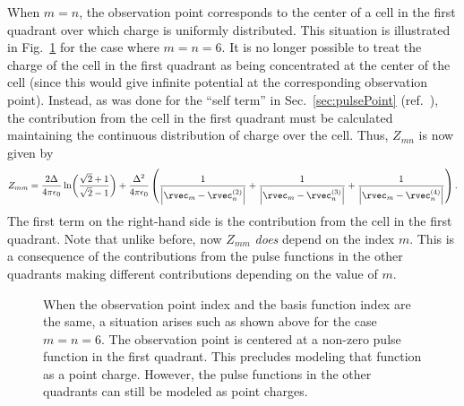 When $m=n$, the observation point corresponds to the center of a cell
in the first quadrant over which charge is uniformly distributed.
This situation is illustrated in Fig.\ \ref{fig:pFourSixSelf} for the
case where $m=n=6$.  It is no longer possible to treat the charge of
the cell in the first quadrant as being concentrated at the center of
the cell (since this would give infinite potential at the
corresponding observation point).  Instead, as was done for the ``self
term'' in Sec.\ \ref{sec:pulsePoint} (ref.\ ), the
contribution from the cell in the first quadrant must be calculated
maintaining the continuous distribution of charge over the cell.
Thus, $Z_{mn}$ is now given by
\begin{equation}
  Z_{mm} = 
   \frac{2\Delta}{4\pi\epsilon_0}
   \ln\!\left(\frac{\sqrt{2}+1}{\sqrt{2}-1}\right) + 
  \frac{\Delta^2}{4\pi\epsilon_0}
  \left(
      \frac{1}{\left|\rvec_m - \rvec_n^{(2)}\right|}
    + \frac{1}{\left|\rvec_m - \rvec_n^{(3)}\right|}
    + \frac{1}{\left|\rvec_m - \rvec_n^{(4)}\right|}
 \right).
\end{equation}
The first term on the right-hand side is the contribution from the cell
in the first quadrant.  Note that unlike before, now $Z_{mm}$ {\em does}
depend on the index $m$.  This is a consequence of the contributions
from the pulse functions in the other quadrants making different
contributions depending on the value of $m$.
\begin{figure}
  \begin{center}
   \end{center}
  \caption{When the observation point index and the basis function
  index are the same, a situation arises such as shown above for the
  case $m=n=6$.  The observation point is centered at a non-zero
  pulse function in the first quadrant.  This precludes modeling that
  function as a point charge.  However, the pulse functions in the
  other quadrants can still be modeled as point charges.}
  \label{fig:pFourSixSelf}
\end{figure}


